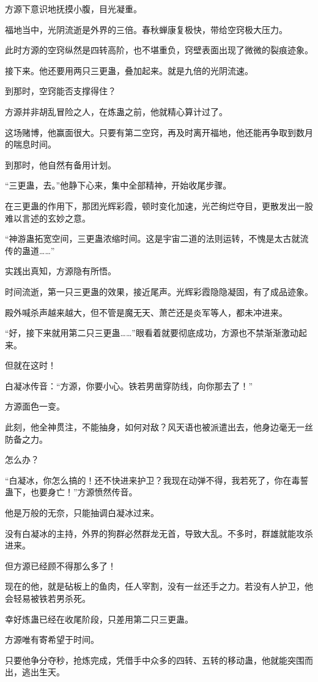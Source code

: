 \begin{this_body}
方源下意识地抚摸小腹，目光凝重。

福地当中，光阴流逝是外界的三倍。春秋蝉康复极快，带给空窍极大压力。

此时方源的空窍纵然是四转高阶，也不堪重负，窍壁表面出现了微微的裂痕迹象。

接下来。他还要用两只三更蛊，叠加起来。就是九倍的光阴流速。

到那时，空窍能否支撑得住？

方源并非胡乱冒险之人，在炼蛊之前，他就精心算计过了。

这场赌博，他赢面很大。只要有第二空窍，再及时离开福地，他还能再争取到数月的喘息时间。

到那时，他自然有备用计划。

“三更蛊，去。”他静下心来，集中全部精神，开始收尾步骤。

在三更蛊的作用下，那团光辉彩霞，顿时变化加速，光芒绚烂夺目，更散发出一股难以言述的玄妙之意。

“神游蛊拓宽空间，三更蛊浓缩时间。这是宇宙二道的法则运转，不愧是太古就流传的蛊道……”

实践出真知，方源隐有所悟。

时间流逝，第一只三更蛊的效果，接近尾声。光辉彩霞隐隐凝固，有了成品迹象。

殿外喊杀声越来越大，但不管是魔无天、萧芒还是炎军等人，都未冲进来。

“好，接下来就用第二只三更蛊……”眼看着就要彻底成功，方源也不禁渐渐激动起来。

但就在这时！

白凝冰传音：“方源，你要小心。铁若男凿穿防线，向你那去了！”

方源面色一变。

此刻，他全神贯注，不能抽身，如何对敌？风天语也被派遣出去，他身边毫无一丝防备之力。

怎么办？

“白凝冰，你怎么搞的！还不快进来护卫？我现在动弹不得，我若死了，你在毒誓蛊下，也要身亡！”方源愤然传音。

他是万般的无奈，只能抽调白凝冰过来。

没有白凝冰的主持，外界的狗群必然群龙无首，导致大乱。不多时，群雄就能攻杀进来。

但方源已经顾不得那么多了！

现在的他，就是砧板上的鱼肉，任人宰割，没有一丝还手之力。若没有人护卫，他会轻易被铁若男杀死。

幸好炼蛊已经在收尾阶段，只差用第二只三更蛊。

方源唯有寄希望于时间。

只要他争分夺秒，抢炼完成，凭借手中众多的四转、五转的移动蛊，他就能突围而出，逃出生天。


\end{this_body}

